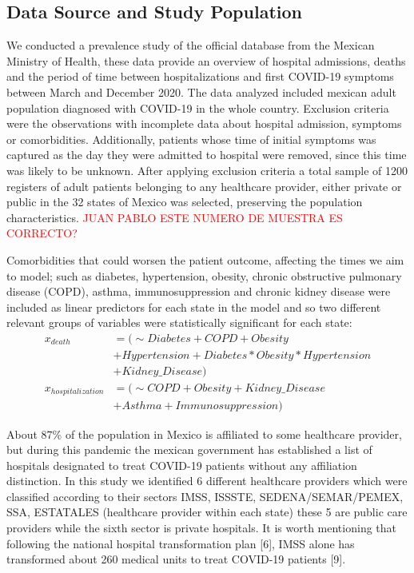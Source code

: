\documentclass[10pt,letterpaper]{article}
\begin{document}
\hypertarget{data-source-and-study-population}{%
\subsection{Data Source and Study
Population}\label{data-source-and-study-population}}

We conducted a prevalence study of the official database from the Mexican
Ministry of Health, these data provide an overview of hospital
admissions, deaths and the period of time between hospitalizations and
first COVID-19 symptoms between March and December 2020. The data analyzed
included mexican adult population diagnosed with COVID-19 in the whole
country. Exclusion criteria were the observations with incomplete
data about hospital admission, symptoms or comorbidities. Additionally,
patients whose time of initial symptoms was captured as the day they were
admitted to hospital were removed, since this time was likely to be
unknown. After applying exclusion criteria a total sample of 1200
registers of adult patients belonging to any healthcare provider,
either private or public in the 32 states of Mexico was selected,
preserving the population characteristics. \textcolor{red}{JUAN PABLO ESTE NUMERO DE
MUESTRA ES CORRECTO?}

Comorbidities that could worsen the patient outcome, affecting the times
we aim to model; such as diabetes, hypertension, obesity, chronic
obstructive pulmonary disease (COPD), asthma, immunosuppression and
chronic kidney disease were included as linear predictors for each state
in the model and so two different relevant groups of variables were statistically
significant for each state:
\[
\begin{aligned}
x_{death} &= (\sim Diabetes+COPD+Obesity \\
 & +Hypertension+Diabetes*Obesity*Hypertension\\
 &+Kidney\_Disease) \\
x_{hospitalization} &= (\sim COPD+Obesity+Kidney\_Disease \\
&+Asthma+Immunosuppression)
\end{aligned}
\]

About 87\% of the population in Mexico is affiliated to some healthcare
provider, but during this pandemic the mexican government has established
a list of hospitals designated to treat COVID-19 patients without any
affiliation distinction. In this study we identified 6 different
healthcare providers which were classified according to their sectors IMSS, ISSSTE,
SEDENA/SEMAR/PEMEX, SSA, ESTATALES (healthcare provider within each
state) these 5 are public care providers while the sixth sector is
private hospitals. It is worth mentioning that following the national
hospital transformation plan {[}6{]}, IMSS alone has transformed about
260 medical units to treat COVID-19 patients {[}9{]}.
\end{document}
